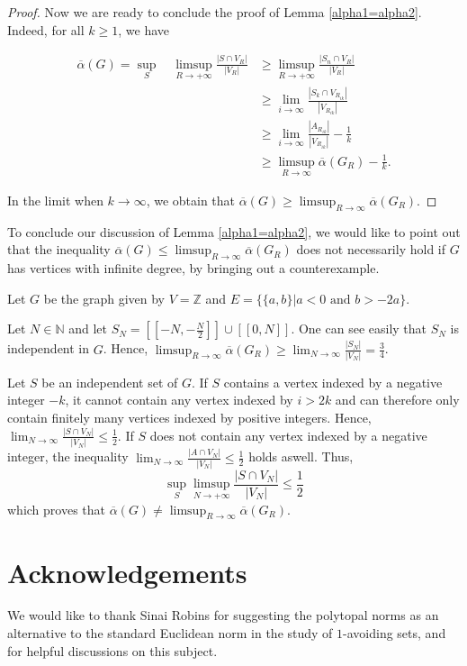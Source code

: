 \documentclass{amsart}                     %
\begin{document}
\begin{proof}


Now we are ready to conclude the proof of Lemma \ref{alpha1=alpha2}. Indeed, for all $k\geq 1$, we have

\[\begin{split}
\overline{\alpha}(G)=\sup_S \quad \limsup_{R\to+\infty} \frac{|S\cap V_R|}{|V_R|}&\geq \limsup_{R\to+\infty} \frac{|S_n\cap V_R|}{|V_R|}\\
&\geq \lim_{i\to\infty} \frac{|S_k\cap V_{R_{ik}}|}{|V_{R_{ik}}|}\\
&\geq \lim_{i\to\infty}\frac{|A_{R_{ik}}|}{|V_{R_{ik}}|}-\frac 1 k\\
&\geq \limsup_{R\to\infty}\overline{\alpha} (G_R) -\frac 1 k.
  \end{split}\]

In the limit when $k\to \infty$, we obtain that $\overline{\alpha}(G)\geq \limsup_{R\to\infty}\overline{\alpha} (G_R)$. 
\end{proof}
  



To conclude our discussion of Lemma \ref{alpha1=alpha2}, we would like to point out that the inequality $\overline{\alpha}(G)\leq \limsup_{R\to\infty}\overline{\alpha} (G_R)$ does not necessarily hold if $G$ has vertices with infinite degree, by bringing out a counterexample.

Let $G$ be the graph given by $V=\mathbb Z$ and $E=\{\{a,b\}|a<0\text{ and }b> -2a\}$.

Let $N\in\mathbb N$ and let $S_N=\left[\!\!\left[ -N,-\frac N 2\right]\!\!\right] \cup[\![ 0,N]\!]$. One can see 
easily that $S_N$ is independent in $G$. Hence, $\limsup_{R\to\infty}\overline{\alpha} (G_R)\geq\lim_{N\to\infty}\frac{|S_N|}{|V_N|}=\frac 3 4 $.

Let $S$ be an independent set of $G$. If $S$ contains a vertex indexed by a negative integer $-k$, it cannot contain any vertex indexed by $i>2k$ and can therefore only contain finitely many vertices indexed by positive integers. Hence, $\lim_{N\to\infty}\frac{|S\cap V_N|}{|V_N|}\leq \frac 1 2$. If $S$ does not contain any vertex indexed by a negative integer, the inequality $\lim_{N\to\infty}\frac{|A\cap V_N|}{|V_N|}\leq \frac 1 2$ holds aswell. Thus, \[\sup_S \limsup_{N\to+\infty} \frac{|S\cap V_N|}{|V_N|}\leq \frac 1 2\]
which proves that $\overline{\alpha}(G)\neq \limsup_{R\to\infty}\overline{\alpha} (G_R)$.






\section*{Acknowledgements}
We would like to thank Sinai Robins for suggesting the polytopal norms as an alternative to the standard Euclidean norm in the study of $1$-avoiding sets, and for helpful discussions on this subject.



\end{document}
